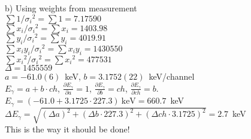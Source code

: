 \documentclass[12pt]{article}
\begin{document}
b) Using weights from measurement\\

$\sum{1/{\sigma_i}^2} = \sum{1} = 7.17590$\\
$\sum{x_i/{\sigma_i}^2} = \sum{x_i} = 1403.98$\\
$\sum{y_i/{\sigma_i}^2} = \sum{y_i} = 4019.91$\\
$\sum{x_iy_i/{\sigma_i}^2} = \sum{x_iy_i} = 1430550$\\
$\sum{{x_i}^2/{\sigma_i}^2} = \sum{{x_i}^2} = 477531$\\
$\Delta=1455559$\\

$a=-61.0(6)$~keV, $b=3.1752(22)$~keV/channel\\

$E_\gamma=a+b\cdot ch$, $\frac{\partial E_\gamma}{\partial a}=1$,
$\frac{\partial E_\gamma}{\partial b}=ch$,
$\frac{\partial E_\gamma}{\partial ch}=b$.\\

$E_\gamma=(-61.0 + 3.1725\cdot 227.3)~\mbox{keV} = 660.7$~keV\\
$\Delta E_\gamma=\sqrt{(\Delta a)^2 + (\Delta b\cdot 227.3)^2
+ (\Delta ch\cdot 3.1725)^2} = 2.7$~keV\\

This is the way it should be done!\\
\end{document}
